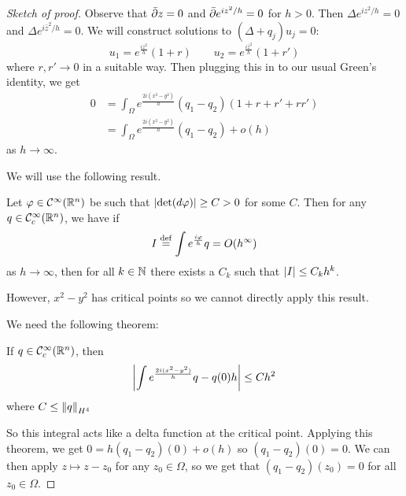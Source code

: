 \begin{proof}[Sketch of proof]
  Observe that $\bar{\partial} z = 0$ and $\bar{\partial} e^{iz^2/h}=0$ for $h>0$.
  Then $\Delta e^{iz^2/h}=0$ and $\Delta e^{i\bar z^2/h}=0$.
  We will construct solutions to $(\Delta+q_j)u_j=0$:
  \[ u_1 = e^\frac{iz^2}{h}(1+r) \qquad u_2 = e^\frac{i\bar z^2}{h}(1+r') \]
  where $r,r' \to 0$ in a suitable way.
  Then plugging this in to our usual Green's identity, we get
  \begin{align*}
    0 &= \int_\Omega e^\frac{2i(x^2-y^2)}{h}(q_1-q_2)(1+r+r'+rr') \\
    &= \int_\Omega e^\frac{2i(x^2-y^2)}{h}(q_1-q_2) + o(h)
  \end{align*}
  as $h\to\infty$.

  We will use the following result.
  \begin{exer}
    Let $\varphi\in\mathcal{C}^\infty(\mathbb{R}^n)$ be such that $\left\lvert \det(d\varphi) \right\rvert \geq C > 0$ for some $C$.
    Then for any $q \in \mathcal{C}_c^\infty(\mathbb{R}^n)$, we have if
    \[ I \overset{\mathrm{def}}{=} \int e^\frac{i\varphi}h q = O(h^\infty) \]
    as $h \to \infty$, then for all $k \in \mathbb{N}$ there exists a $C_k$ such that $\left\lvert I \right\rvert \leq C_k h^k$.
  \end{exer}
  However, $x^2-y^2$ has critical points so we cannot directly apply this result.

  We need the following theorem:
  \begin{thm}\label{6:stat}
    If $q \in \mathcal{C}_c^\infty(\mathbb{R}^n)$, then
    \[ \left\lvert  \int e^\frac{2i(x^2-y^2)}h q - q(0)h  \right\rvert \leq Ch^2 \]
    where $C \leq \left\lVert q \right\rVert_{H^4}$
  \end{thm}

  So this integral acts like a delta function at the critical point.
  Applying this theorem, we get $0 = h(q_1-q_2)(0)+o(h)$ so $(q_1-q_2)(0)=0$.
  We can then apply $z \mapsto z-z_0$ for any $z_0 \in \Omega$, so we get that $(q_1-q_2)(z_0)=0$ for all $z_0 \in \Omega$.
\end{proof}

